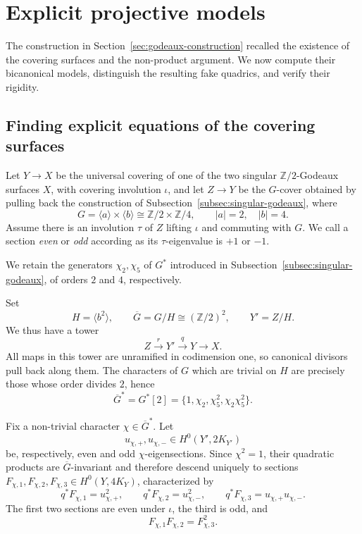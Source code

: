 \documentclass[11pt,a4paper]{article}
\begin{document}
\section{Explicit projective models}
\label{sec:explicit-models}

The construction in Section~\ref{sec:godeaux-construction} recalled the
existence of the covering surfaces and the non-product argument.
We now compute their bicanonical models, distinguish the resulting
fake quadrics, and verify their rigidity.

\subsection{Finding explicit equations of the covering surfaces}
\label{subsec:explicit-equations}

\newline
Let \(Y\longrightarrow X\) be the universal covering of one of the two singular $\mathbb Z/2$-Godeaux surfaces $X$,
with covering involution \(\iota\), and let \(Z\longrightarrow Y\) be the \(G\)-cover
obtained by pulling back the construction of
Subsection~\ref{subsec:singular-godeaux}, where
\[
 G=\langle a\rangle\times\langle b\rangle
   \cong \mathbb Z/2\times\mathbb Z/4,
 \qquad |a|=2,\quad |b|=4.
\]
Assume there is an involution \(\tau\) of \(Z\) lifting \(\iota\) and commuting
with \(G\).  We call a section \emph{even} or \emph{odd} according as its
\(\tau\)-eigenvalue is \(+1\) or \(-1\).

We retain the generators \(\chi _2,\chi _5\) of \(G^*\) introduced in
Subsection~\ref{subsec:singular-godeaux}, of orders $2$ and $4$,
respectively.

Set
\[
 H=\langle b^2\rangle,\qquad
 \overline G=G/H\cong(\mathbb Z/2)^2,\qquad
 Y'=Z/H.
\]
We thus have a tower
\[
        Z\xrightarrow{\ r\ }Y'
        \xrightarrow{\ q\ }Y
        \longrightarrow X.
\]
All maps in this tower are unramified in codimension one, so canonical
divisors pull back along them.  The characters of \(G\) which are trivial
on \(H\) are precisely those whose order divides $2$, hence
\[
 \overline G^*=G^*[2]
   =\{1,\chi _2,\chi _5^2,\chi _2\chi _5^2\}.
\]

Fix a non-trivial character \(\chi\in\overline G^*\).  Let
\[
 u_{\chi,+},u_{\chi,-}\in H^0(Y',2K_{Y'})
\]
be, respectively, even and odd \(\chi\)-eigensections.  Since
\(\chi^2=1\), their quadratic products are \(\overline G\)-invariant and
therefore descend uniquely to sections
\(F_{\chi,1},F_{\chi,2},F_{\chi,3}\in H^0(Y,4K_Y)\), characterized by
\[
 q^*F_{\chi,1}=u_{\chi,+}^2,\qquad
 q^*F_{\chi,2}=u_{\chi,-}^2,\qquad
 q^*F_{\chi,3}=u_{\chi,+}u_{\chi,-}.
\]
The first two sections are even under \(\iota\), the third is odd, and
\begin{equation}
        F_{\chi,1}F_{\chi,2}=F_{\chi,3}^2.
        \label{eq:rank-one-relation}
\end{equation}
\end{document}
